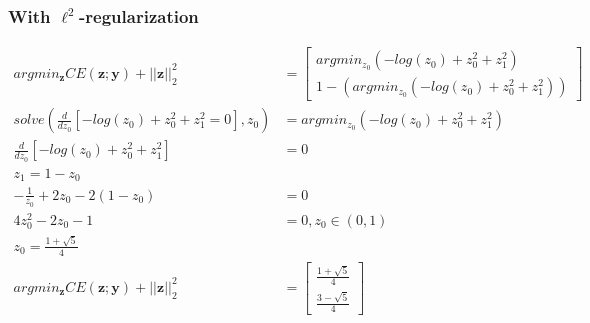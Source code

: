 \documentclass{article}
\begin{document}
\subsubsection*{With $\ell^2$-regularization}
\begin{equation}
    \begin{split}
        argmin_\mathbf{z} CE(\mathbf{z}; \mathbf{y})+||\mathbf{z}||_2^2&=\begin{bmatrix}argmin_{z_0}(-log(z_0)+z_0^2+z_1^2)\\1-\left(argmin_{z_0}(-log(z_0)+z_0^2+z_1^2)\right)\end{bmatrix}\\
        solve(\frac{d}{dz_0}\left[-log(z_0)+z_0^2+z_1^2=0\right],z_0)&=argmin_{z_0}(-log(z_0)+z_0^2+z_1^2)\\
        \frac{d}{dz_0}\left[-log(z_0)+z_0^2+z_1^2\right]&=0\\
        \text{$z_1=1-z_0$}\\
        -\frac{1}{z_0}+2z_0-2(1-z_0)&=0\\
        4z_0^2-2z_0-1&=0, z_0\in(0,1)\\
        z_0 = \frac{1+\sqrt{5}}{4}\\
        argmin_\mathbf{z} CE(\mathbf{z}; \mathbf{y})+||\mathbf{z}||_2^2&=\begin{bmatrix}\frac{1+\sqrt{5}}{4}\\\frac{3-\sqrt{5}}{4}\end{bmatrix}\\
    \end{split}
\end{equation}
\end{document}
